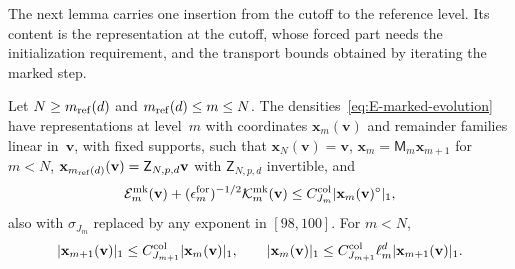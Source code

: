 The next lemma carries one insertion from the cutoff to the reference level. Its content is the representation at the cutoff, whose forced part needs the initialization requirement, and the transport bounds obtained by iterating the marked step.
\begin{lemma}\label{lem:E2.1}\label{lem:E2.2}
Let $N\ge m_{\mathrm{ref}}(d)$ and $m_{\mathrm{ref}}(d)\le m\le N$. The densities~\eqref{eq:E-marked-evolution} have representations at level~$m$ with coordinates $\mathbf x_m(\mathbf v)$ and remainder families linear in~$\mathbf v$, with fixed supports, such that $\mathbf x_N(\mathbf v)=\mathbf v$, $\mathbf x_m=\mathsf M_m\mathbf x_{m+1}$ for $m<N$, $\mathbf x_{m_{\mathrm{ref}}(d)}(\mathbf v)=\mathsf Z_{N,p,d}\mathbf v$ with $\mathsf Z_{N,p,d}$ invertible, and
\begin{equation*}
\mathcal E^{\rm mk}_m(\mathbf v)+(\epsilon_m^{\rm for})^{-1/2}\mathcal K^{\rm mk}_m(\mathbf v)
\le C^{\rm col}_{J_m}|\mathbf x_m(\mathbf v)^\circ|_1,
\end{equation*}
also with $\sigma_{J_m}$ replaced by any exponent in $[98,100]$. For $m<N$,
\begin{equation*}
|\mathbf x_{m+1}(\mathbf v)|_1\le C^{\rm col}_{J_{m+1}}|\mathbf x_m(\mathbf v)|_1,
\qquad |\mathbf x_m(\mathbf v)|_1\le C^{\rm col}_{J_{m+1}}\ell_m^d|\mathbf x_{m+1}(\mathbf v)|_1.
\end{equation*}
\end{lemma}
